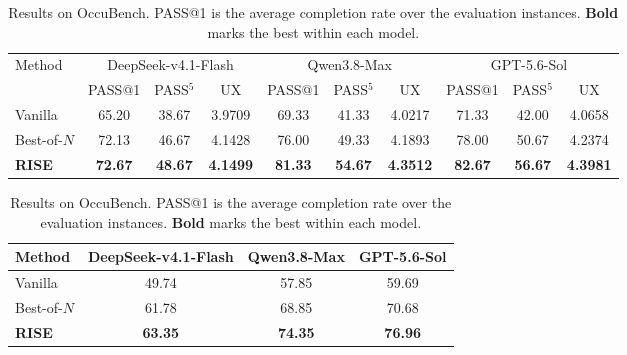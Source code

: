 \documentclass{article}
\newcommand{\method}{RISE\xspace}
\begin{document}
\begin{table}[t]
\centering
\small
\begin{minipage}{\linewidth}
\centering
\caption{Results on StateBench. PASS$^5$ requires completion in all five independent runs and UX is rated from 1 to 5. \textbf{Bold} marks the best within each model.}
\label{tab:statebench}
\setlength{\tabcolsep}{4pt}
\begin{tabular}{lccccccccc}
\toprule
\multirow{2}{*}{Method} & \multicolumn{3}{c}{DeepSeek-v4.1-Flash} & \multicolumn{3}{c}{Qwen3.8-Max} & \multicolumn{3}{c}{GPT-5.6-Sol} \\
\cmidrule(lr){2-4}\cmidrule(lr){5-7}\cmidrule(l){8-10}
 & PASS@1 & PASS$^5$ & UX & PASS@1 & PASS$^5$ & UX & PASS@1 & PASS$^5$ & UX \\
\midrule
Vanilla & 65.20 & 38.67 & 3.9709 & 69.33 & 41.33 & 4.0217 & 71.33 & 42.00 & 4.0658 \\
\mbox{Best-of-$N$} & 72.13 & 46.67 & 4.1428 & 76.00 & 49.33 & 4.1893 & 78.00 & 50.67 & 4.2374 \\
\textbf{\method} & \textbf{72.67} & \textbf{48.67} & \textbf{4.1499} & \textbf{81.33} & \textbf{54.67} & \textbf{4.3512} & \textbf{82.67} & \textbf{56.67} & \textbf{4.3981} \\
\bottomrule
\end{tabular}
\end{minipage}

\vspace{8pt}
\begin{minipage}{\linewidth}
\centering
\caption{Results on OccuBench. PASS@1 is the average completion rate over the evaluation instances. \textbf{Bold} marks the best within each model.}
\label{tab:occubench}
\setlength{\tabcolsep}{10pt}
\begin{tabular}{lccc}
\toprule
Method & DeepSeek-v4.1-Flash & Qwen3.8-Max & GPT-5.6-Sol \\
\midrule
Vanilla & 49.74 & 57.85 & 59.69 \\
\mbox{Best-of-$N$} & 61.78 & 68.85 & 70.68 \\
\textbf{\method} & \textbf{63.35} & \textbf{74.35} & \textbf{76.96} \\
\bottomrule
\end{tabular}
\end{minipage}
\end{table}
\end{document}
